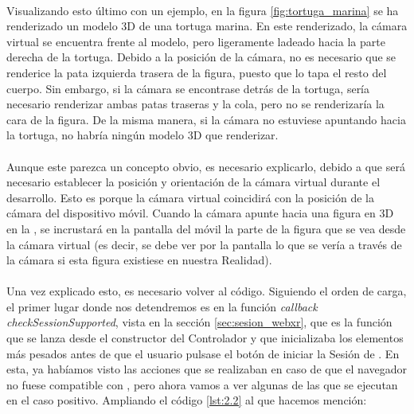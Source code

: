 \documentclass{subfiles}
\begin{document}
        \paragraph{}
        Visualizando esto último con un ejemplo, en la figura \ref{fig:tortuga_marina} se ha renderizado un modelo 3D de una tortuga marina. En este renderizado, la cámara virtual se encuentra frente al modelo, pero ligeramente ladeado hacia la parte derecha de la tortuga. Debido a la posición de la cámara, no es necesario que se renderice la pata izquierda trasera de la figura, puesto que lo tapa el resto del cuerpo. Sin embargo, si la cámara se encontrase detrás de la tortuga, sería necesario renderizar ambas patas traseras y la cola, pero no se renderizaría la cara de la figura. De la misma manera, si la cámara no estuviese apuntando hacia la tortuga, no habría ningún modelo 3D que renderizar.
        
        \paragraph{}
        Aunque este parezca un concepto obvio, es necesario explicarlo, debido a que será necesario establecer la posición y orientación de la cámara virtual durante el desarrollo. Esto es porque la cámara virtual coincidirá con la posición de la cámara del dispositivo móvil. Cuando la cámara apunte hacia una figura en 3D en la \ra, se incrustará en la pantalla del móvil la parte de la figura que se vea desde la cámara virtual (es decir, se debe ver por la pantalla lo que se vería a través de la cámara si esta figura existiese en nuestra Realidad).

        \paragraph{}
        Una vez explicado esto, es necesario volver al código. Siguiendo el orden de carga, el primer lugar donde nos detendremos es en la función \textit{callback} \textit{checkSessionSupported}, vista en la sección \ref{sec:sesion_webxr}, que es la función que se lanza desde el constructor del Controlador y que inicializaba los elementos más pesados antes de que el usuario pulsase el botón de iniciar la Sesión de \ra. En esta, ya habíamos visto las acciones que se realizaban en caso de que el navegador no fuese compatible con \webxr, pero ahora vamos a ver algunas de las que se ejecutan en el caso positivo. Ampliando el código \ref{lst:2.2} al que hacemos mención:
\end{document}
